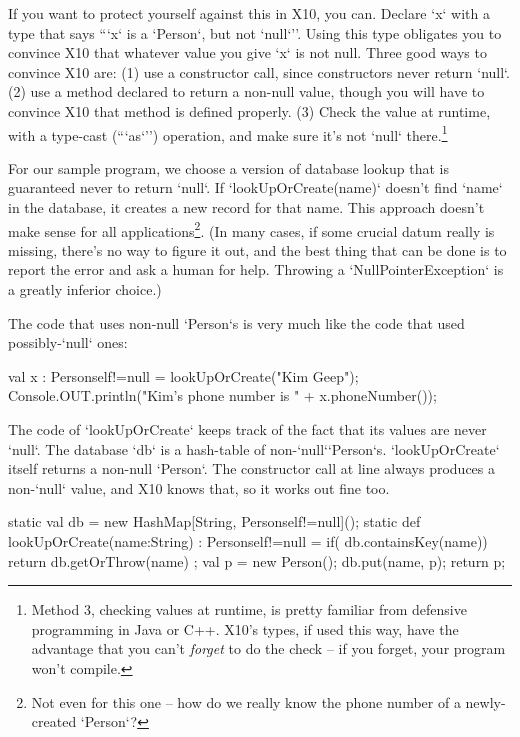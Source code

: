 If you want to protect yourself against this in X10, you can.  Declare \xcd`x`
with a type that says ``\xcd`x` is a \xcd`Person`, but not \xcd`null`''.  
Using this type obligates you to convince X10 that whatever value you give
\xcd`x` is not null.  Three good ways to convince X10 are: (1) use a
constructor call, since constructors never return \xcd`null`. 
(2) use a method declared to return a non-null value, though you will have to
convince X10 that method is defined properly. (3) Check the value at runtime,
with a type-cast (``\xcd`as`'') operation, 
and make sure it's not \xcd`null` there.\footnote{Method 3, checking values at
runtime, is pretty familiar from defensive programming in Java or C++.  X10's
types, if used this way, have the advantage that you can't {\em forget} to do
the check -- if you forget, your program won't compile.}

For our sample program, we choose a version of database lookup that is
guaranteed never to return \xcd`null`.  If \xcd`lookUpOrCreate(name)` doesn't
find \xcd`name` in the database, it creates a new record for that name.  This
approach doesn't make sense for all applications\footnote{Not even for this
one -- how do we really know the phone number of a newly-created
\xcd`Person`?}.  (In many cases, if some crucial datum really is missing,
there's no way to figure it out, and the best thing that can be done is  to
report the error and ask a human for help.  Throwing a
\xcd`NullPointerException` is a greatly inferior choice.)

The code that uses non-null \xcd`Person`s is very much like the code that used
possibly-\xcd`null` ones: 
\begin{xtennum}[]
val x : Person{self!=null} = lookUpOrCreate("Kim Geep");
Console.OUT.println("Kim's phone number is " + x.phoneNumber());
\end{xtennum}

The code of \xcd`lookUpOrCreate` keeps track of the fact that its values are
never \xcd`null`.  The database \xcd`db` is a hash-table of
non-\xcd`null`\xcd`Person`s.  \xcd`lookUpOrCreate` itself returns a non-null
\xcd`Person`.  The constructor call at line 
always produces a non-\xcd`null` value, and X10 knows that, so it works out
fine too.
\begin{xtennum}[]
static val db = new HashMap[String, Person{self!=null}]();
static def lookUpOrCreate(name:String) : Person{self!=null} = {
  if( db.containsKey(name)) {
     return db.getOrThrow(name) ;
  }
  val p = new Person(); 
  db.put(name, p);
  return p;
}
\end{xtennum}




